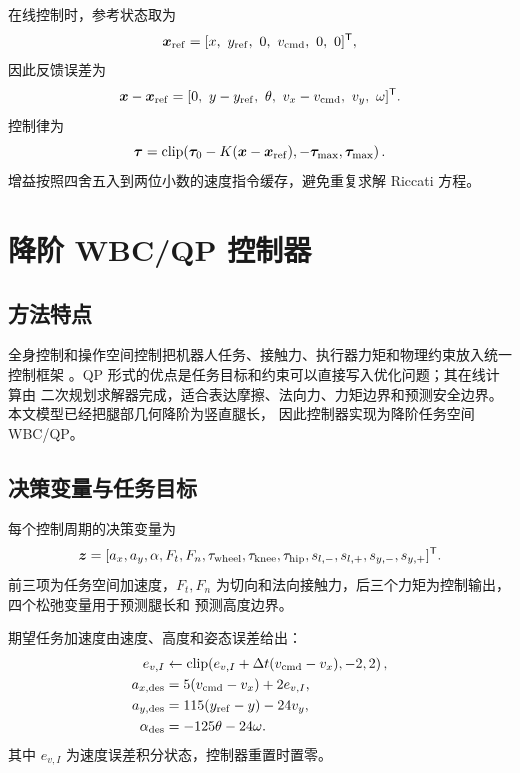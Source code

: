 \documentclass[UTF8,12pt,a4paper,fontset=none]{ctexart}
\begin{document}
在线控制时，参考状态取为
\begin{equation}
\bm x_{\rm ref}=[x,\ y_{\rm ref},\ 0,\ v_{\rm cmd},\ 0,\ 0]^{\mathsf T},
\end{equation}
因此反馈误差为
\begin{equation}
\bm x-\bm x_{\rm ref}=[0,\ y-y_{\rm ref},\ \theta,\ v_x-v_{\rm cmd},\ v_y,\ \omega]^{\mathsf T}.
\end{equation}
控制律为
\begin{equation}
\bm\tau=\operatorname{clip}\!\left(\bm\tau_0-K(\bm x-\bm x_{\rm ref}),
-\bm\tau_{\max},\bm\tau_{\max}\right).
\end{equation}
增益按照四舍五入到两位小数的速度指令缓存，避免重复求解 Riccati 方程。

\section{降阶 WBC/QP 控制器}

\subsection{方法特点}
全身控制和操作空间控制把机器人任务、接触力、执行器力矩和物理约束放入统一控制框架
\cite{Khatib1987OperationalSpace}。QP 形式的优点是任务目标和约束可以直接写入优化问题；其在线计算由
二次规划求解器完成，适合表达摩擦、法向力、力矩边界和预测安全边界。本文模型已经把腿部几何降阶为竖直腿长，
因此控制器实现为降阶任务空间 WBC/QP。

\subsection{决策变量与任务目标}
每个控制周期的决策变量为
\begin{equation}
\bm z=[a_x,a_y,\alpha,F_t,F_n,\tau_{\rm wheel},\tau_{\rm knee},\tau_{\rm hip},
 s_{l,-},s_{l,+},s_{y,-},s_{y,+}]^{\mathsf T}.
\end{equation}
前三项为任务空间加速度，$F_t,F_n$ 为切向和法向接触力，后三个力矩为控制输出，四个松弛变量用于预测腿长和
预测高度边界。

期望任务加速度由速度、高度和姿态误差给出：
\begin{align}
e_{v,I}&\leftarrow\operatorname{clip}\!\left(e_{v,I}+\Delta t(v_{\rm cmd}-v_x),-2,2\right),\\
a_{x,\rm des}&=5(v_{\rm cmd}-v_x)+2e_{v,I},\\
a_{y,\rm des}&=115(y_{\rm ref}-y)-24v_y,\\
\alpha_{\rm des}&=-125\theta-24\omega.
\end{align}
其中 $e_{v,I}$ 为速度误差积分状态，控制器重置时置零。
\end{document}
